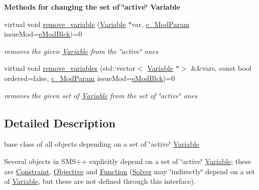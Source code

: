 \begin{Indent}\textbf{ Methods for changing the set of \char`\"{}active\char`\"{} Variable}\par
\begin{DoxyCompactItemize}
\item 
virtual void \mbox{\hyperlink{group___thin_var_dep_interface___c_l_a_s_s_e_s_gad6726141a0cbe6a0410a2b396809dade}{remove\+\_\+variable}} (\mbox{\hyperlink{class_s_m_spp__di__unipi__it_1_1_variable}{Variable}} $\ast$var, \mbox{\hyperlink{group___modification___t_y_p_e_s_ga544246d8c462e9a2d817c2c30797968f}{c\+\_\+\+Mod\+Param}} issue\+Mod=\mbox{\hyperlink{group___modification___t_y_p_e_s_gga48fddcdd03a03f49b7e389ca1ed938d4a21b14b26b1c0093a0905f6fc010bad29}{e\+Mod\+Blck}})=0
\begin{DoxyCompactList}\small\item\em removes the given \mbox{\hyperlink{class_s_m_spp__di__unipi__it_1_1_variable}{Variable}} from the \char`\"{}active\char`\"{} ones \end{DoxyCompactList}\item 
virtual void \mbox{\hyperlink{group___thin_var_dep_interface___c_l_a_s_s_e_s_ga4f21d262d25ed93ccc289134f2618ba9}{remove\+\_\+variables}} (std\+::vector$<$ \mbox{\hyperlink{class_s_m_spp__di__unipi__it_1_1_variable}{Variable}} $\ast$$>$ \&\&vars, const bool ordered=false, \mbox{\hyperlink{group___modification___t_y_p_e_s_ga544246d8c462e9a2d817c2c30797968f}{c\+\_\+\+Mod\+Param}} issue\+Mod=\mbox{\hyperlink{group___modification___t_y_p_e_s_gga48fddcdd03a03f49b7e389ca1ed938d4a21b14b26b1c0093a0905f6fc010bad29}{e\+Mod\+Blck}})=0
\begin{DoxyCompactList}\small\item\em removes the given set of \mbox{\hyperlink{class_s_m_spp__di__unipi__it_1_1_variable}{Variable}} from the set of \char`\"{}active\char`\"{} ones \end{DoxyCompactList}\end{DoxyCompactItemize}
\end{Indent}


\subsection{Detailed Description}
base class of all objects depending on a set of \char`\"{}active\char`\"{} \mbox{\hyperlink{class_s_m_spp__di__unipi__it_1_1_variable}{Variable}} 

Several objects in S\+M\+S++ explicitly depend on a set of \char`\"{}active\char`\"{} \mbox{\hyperlink{class_s_m_spp__di__unipi__it_1_1_variable}{Variable}}; these are \mbox{\hyperlink{class_s_m_spp__di__unipi__it_1_1_constraint}{Constraint}}, \mbox{\hyperlink{class_s_m_spp__di__unipi__it_1_1_objective}{Objective}} and \mbox{\hyperlink{class_s_m_spp__di__unipi__it_1_1_function}{Function}} (\mbox{\hyperlink{class_s_m_spp__di__unipi__it_1_1_solver}{Solver}} may \char`\"{}indirectly\char`\"{} depend on a set of \mbox{\hyperlink{class_s_m_spp__di__unipi__it_1_1_variable}{Variable}}, but these are not defined through this interface).

